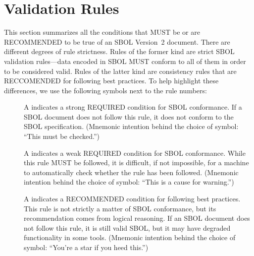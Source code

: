 \newcommand{\printValid}{\validRule{sbol-\arabic{sbolCtr}\addtocounter{sbolCtr}{1}}}
\newcommand{\printWarning}{\consistencyRule{sbol-\arabic{sbolCtr}\addtocounter{sbolCtr}{1}}}
\newcommand{\printModeling}{\modelingRule{sbol-\arabic{sbolCtr}\addtocounter{sbolCtr}{1}}}

\section{Validation Rules}
\label{validation}


This section summarizes all the conditions that MUST be or 
are RECOMMENDED to be true of an SBOL Version~2 document.  
There are different degrees of rule strictness.  
Rules of the former kind are strict SBOL validation rules---data encoded in SBOL MUST conform to
all of them in order to be considered valid.  Rules of the latter kind
are consistency rules that are RECCOMENDED for following best practices.  To help highlight these differences, we use the
following symbols next to the rule numbers:

\begin{description}

\item[\hspace*{6.5pt}\vSymbol\vsp] A \vSymbolName indicates a strong
  REQUIRED condition for SBOL conformance. If a SBOL document does not follow this rule, it does not conform to the SBOL
  specification.  (Mnemonic intention behind the choice of symbol:
  ``This must be checked.'')

\item[\hspace*{6.5pt}\cSymbol\csp] A \cSymbolName indicates a weak
  REQUIRED condition for SBOL conformance. While this rule MUST be followed, it is difficult, if not  impossible, for a machine to automatically check whether the rule has been followed. (Mnemonic intention behind the choice of symbol: ``This is a cause for warning.'')

\item[\hspace*{6.5pt}\mSymbol\msp] A \mSymbolName indicates a 
  RECOMMENDED condition for following best practices.  This rule is not strictly a matter of SBOL conformance, but its recommendation comes from logical
  reasoning.  If an SBOL document does not follow this rule, it is still valid SBOL, but it may have degraded functionality in some tools.  (Mnemonic intention behind the choice of symbol: ``You're a star if you heed this.'')

\end{description}

